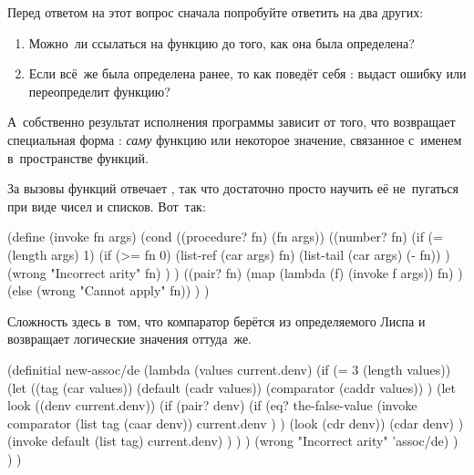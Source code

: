 
Перед ответом на этот вопрос сначала попробуйте ответить на два других:

\begin{enumerate}
  \item Можно~ли ссылаться на функцию  до того, как она была
        определена?

  \item Если  всё~же была определена ранее, то как поведёт себя
        : выдаст ошибку или переопределит функцию?
\end{enumerate}

А~собственно результат исполнения программы зависит от того, что возвращает
специальная форма : \emph{саму} функцию  или некоторое
значение, связанное с~именем  в~пространстве функций.



За вызовы функций отвечает , так что достаточно просто научить её
не~пугаться при виде чисел и списков. Вот~так:

\begin{code:lisp}
(define (invoke fn args)
  (cond ((procedure? fn) (fn args))
        ((number? fn)
         (if (= (length args) 1)
             (if (>= fn 0)
                 (list-ref (car args) fn)
                 (list-tail (car args) (- fn)) )
             (wrong "Incorrect arity" fn) ) )
        ((pair? fn)
         (map (lambda (f) (invoke f args)) fn) )
        (else (wrong "Cannot apply" fn)) ) )
\end{code:lisp}



Сложность здесь в~том, что компаратор берётся из определяемого Лиспа и
возвращает логические значения оттуда~же.

\begin{code:lisp}
(definitial new-assoc/de
  (lambda (values current.denv)
    (if (= 3 (length values))
        (let ((tag        (car values))
              (default    (cadr values))
              (comparator (caddr values)) )
          (let look ((denv current.denv))
            (if (pair? denv)
                (if (eq? the-false-value
                         (invoke comparator (list tag (caar denv))
                                            current.denv ) )
                    (look (cdr denv))
                    (cdar denv) )
                (invoke default (list tag) current.denv) ) ) )
        (wrong "Incorrect arity" 'assoc/de) ) ) )
\end{code:lisp}


